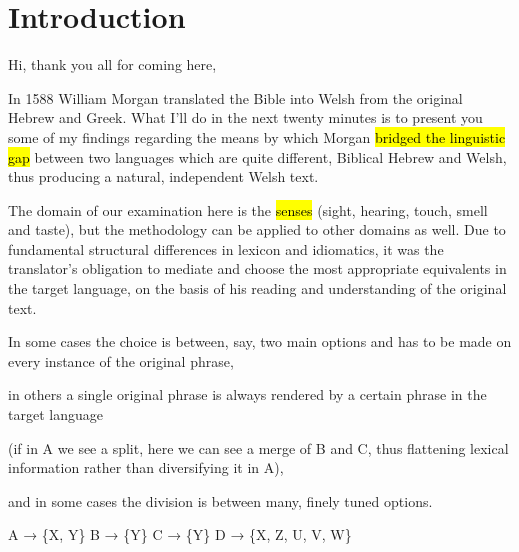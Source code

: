 \section{Introduction}

\begin{paper}
	{\click} Hi, thank you all for coming here,

	{\click} In 1588 William Morgan translated the Bible into Welsh from the original Hebrew and Greek. What I’ll do in the next twenty minutes is to present you some of my findings regarding the means by which Morgan \hl{bridged the linguistic gap} between two languages which are quite different, Biblical Hebrew and Welsh, thus producing a natural, independent Welsh text.

	The domain of our examination here is the \hl{senses} (sight, hearing, touch, smell and taste), but the methodology can be applied to other domains as well. Due to fundamental structural differences in lexicon and idiomatics, it was the translator’s obligation to mediate and choose the most appropriate equivalents in the target language, on the basis of his reading and understanding of the original text.

	\begin{compactitem}
		\item {\click}  In some cases the choice is between, say, two main options and has to be made on every instance of the original phrase,
		\item {} in others a single original phrase is always rendered by a certain phrase in the target language
			\begin{compactitem}
				\item (if in A we see a split, here we can see a merge of B and C, thus flattening lexical information rather than diversifying it in A),
			\end{compactitem}
		\item and in  some cases the division is between many, finely tuned options.
	\end{compactitem}
\end{paper}

\begin{hopoint}
	A → \{X, Y\}\hfill
	B → \{Y\}\hfill
	C → \{Y\}\hfill
	D → \{X, Z, U, V, W\}
\end{hopoint}

